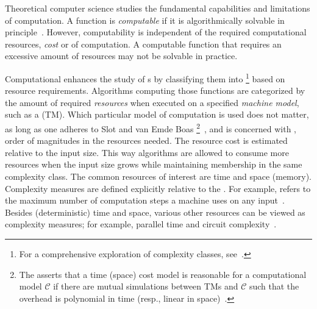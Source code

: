 Theoretical computer science studies the fundamental capabilities and
limitations of computation. A function is \emph{computable} if it is algorithmically solvable in principle~\cite[\mbox{p.
234}]{sipser2012}. However, computability is independent of the required
computational resources, \ie \emph{cost} or \emph{} of
computation. A computable function that requires an excessive amount of
resources may not be solvable in practice.

Computational  enhances the study of s by classifying them into \emph{}\footnote{For
a comprehensive exploration of complexity classes,
see~\textcite{complexityzoo}.} based on resource requirements. Algorithms computing those functions are categorized by the amount of
required \emph{resources} when executed on a specified
\emph{machine model}, such as a  (TM). Which particular
model of computation is used does not matter, as long as
one adheres to Slot and van Emde Boas \footnote{The
 asserts that a time (\resp space) cost model is
reasonable for a computational model \(\mathcal{C}\) if there are mutual simulations between TMs and \(\mathcal{C}\) such that
the overhead is polynomial in time (resp., linear in
space)~\cite{vanoni2022}.}~\cite{slot1984}, and is concerned with
, \ie order of magnitudes in the resources needed. The
resource cost is estimated relative to the input size.
This way algorithms are allowed to consume more resources when the input size
grows while maintaining membership in the same complexity class. The common resources of interest are time and
space (memory). Complexity measures are defined explicitly relative to the . For
example,  refers to the maximum number of computation steps
a machine uses on any input~\cite[p. 276]{sipser2012}.
Besides (deterministic) time and space, various other resources can be viewed as
complexity measures; for example, parallel
time and circuit complexity~\cite[p. 428]{sipser2012}.

